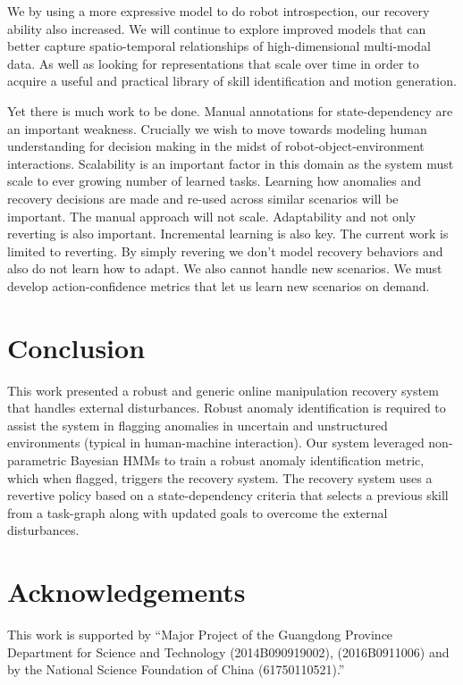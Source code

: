 \documentclass[letterpaper, 10 pt, conference]{ieeeconf}  %
\begin{document}
We by using a more expressive model to do robot introspection, our recovery ability also increased. We will continue to explore improved models that can better capture spatio-temporal relationships of high-dimensional multi-modal data. As well as looking for representations that scale over time in order to acquire a useful and practical library of skill identification and motion generation.

Yet there is much work to be done. Manual annotations for state-dependency are an important weakness. Crucially we wish to move towards modeling human understanding for decision making in the midst of robot-object-environment interactions. Scalability is an important factor in this domain as the system must scale to ever growing number of learned tasks. Learning how anomalies and recovery decisions are made and re-used across similar scenarios will be important. The manual approach will not scale. Adaptability and not only reverting is also important. Incremental learning is also key. The current work is limited to reverting. By simply revering we don't model recovery behaviors and also do not learn how to adapt. We also cannot handle new scenarios. We must develop action-confidence metrics that let us learn new scenarios on demand. 
\section{Conclusion} \label{sec:conclusion}
This work presented a robust and generic online manipulation recovery system that handles external disturbances. Robust anomaly identification is required to assist the system in flagging anomalies in uncertain and unstructured environments (typical in human-machine interaction). Our system leveraged non-parametric Bayesian HMMs to train a robust anomaly identification metric, which when flagged, triggers the recovery system. The recovery system uses a revertive policy based on a state-dependency criteria that selects a previous skill from a task-graph along with updated goals to overcome the external disturbances. 
\section{Acknowledgements} \label{sec:Acknowledgements}
This work is supported by ``Major Project of the Guangdong Province Department for Science and Technology (2014B090919002), (2016B0911006) and by the National Science Foundation of China (61750110521).''


\end{document}
